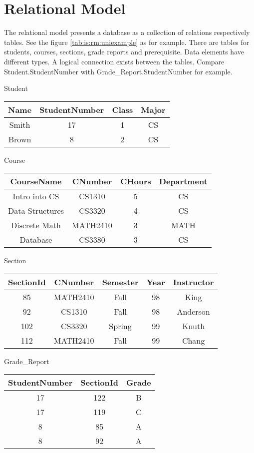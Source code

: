 \section{Relational Model}
The relational model presents a database as a collection of relations
respectively tables. See the figure \ref{tab:is:rm:uniexample} as for example.
There are tables for students, courses, sections, grade reports and
prerequisite. Data elements have different types. A logical connection exists
between the tables. Compare Student.Student\-Number with
Grade\_Report.Student\-Number for example.

\begin{table}[h]
Student\\
\begin{tabular}{|c|c|c|c|}
\hline
Name & StudentNumber & Class & Major \\
\hline
Smith & 17 & 1 & CS\\ 
\hline
Brown & 8 & 2 & CS\\ 
\hline
\end{tabular}

Course\\
\begin{tabular}{|c|c|c|c|}
\hline
CourseName & CNumber & CHours & Department\\
\hline
Intro into CS & CS1310 & 5 & CS\\
\hline
Data Structures & CS3320 & 4 & CS\\
\hline
Discrete Math & MATH2410 & 3 & MATH\\
\hline
Database & CS3380 & 3 & CS\\
\hline
\end{tabular}

Section\\
\begin{tabular}{|c|c|c|c|c|}
\hline
SectionId & CNumber & Semester & Year & Instructor\\
\hline
85 & MATH2410 & Fall & 98 & King\\
\hline
92 & CS1310 & Fall & 98 & Anderson\\
\hline
102 & CS3320 & Spring & 99 & Knuth\\
\hline
112 & MATH2410 & Fall & 99 & Chang\\
\hline
\end{tabular}

Grade\_Report\\
\begin{tabular}{|c|c|c|}
\hline
StudentNumber & SectionId & Grade \\
\hline
17 & 122 & B\\
\hline
17 & 119 & C\\
\hline
8 & 85 & A\\
\hline
8 & 92 & A\\
\hline
\end{tabular}


\end{table}
